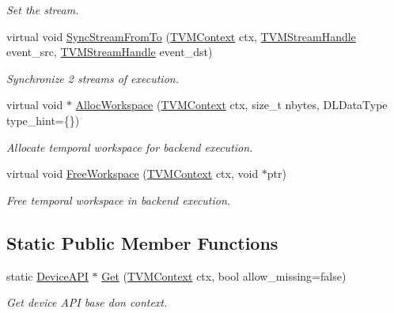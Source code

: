 \begin{DoxyCompactItemize}
\begin{DoxyCompactList}\small\item\em Set the stream. \end{DoxyCompactList}\item 
virtual void \hyperlink{classtvm_1_1runtime_1_1DeviceAPI_ac913e53e874729157e560efc7bc32420}{Sync\+Stream\+From\+To} (\hyperlink{c__runtime__api_8h_a9363bb701f16ce5bbb381f2a013d25b4}{T\+V\+M\+Context} ctx, \hyperlink{c__runtime__api_8h_ab1d5f6b7945e1410602a8a057fda5757}{T\+V\+M\+Stream\+Handle} event\+\_\+src, \hyperlink{c__runtime__api_8h_ab1d5f6b7945e1410602a8a057fda5757}{T\+V\+M\+Stream\+Handle} event\+\_\+dst)
\begin{DoxyCompactList}\small\item\em Synchronize 2 streams of execution. \end{DoxyCompactList}\item 
virtual void $\ast$ \hyperlink{classtvm_1_1runtime_1_1DeviceAPI_a1294018fb28de0f67754d8df98c1e0bd}{Alloc\+Workspace} (\hyperlink{c__runtime__api_8h_a9363bb701f16ce5bbb381f2a013d25b4}{T\+V\+M\+Context} ctx, size\+\_\+t nbytes, D\+L\+Data\+Type type\+\_\+hint=\{\})
\begin{DoxyCompactList}\small\item\em Allocate temporal workspace for backend execution. \end{DoxyCompactList}\item 
virtual void \hyperlink{classtvm_1_1runtime_1_1DeviceAPI_af096fadcf68d2fad804fc8a00a4f4311}{Free\+Workspace} (\hyperlink{c__runtime__api_8h_a9363bb701f16ce5bbb381f2a013d25b4}{T\+V\+M\+Context} ctx, void $\ast$ptr)
\begin{DoxyCompactList}\small\item\em Free temporal workspace in backend execution. \end{DoxyCompactList}\end{DoxyCompactItemize}
\subsection*{Static Public Member Functions}
\begin{DoxyCompactItemize}
\item 
static \hyperlink{classtvm_1_1runtime_1_1DeviceAPI}{Device\+A\+PI} $\ast$ \hyperlink{classtvm_1_1runtime_1_1DeviceAPI_a50365326f6a7cd2f975f72d6503933d8}{Get} (\hyperlink{c__runtime__api_8h_a9363bb701f16ce5bbb381f2a013d25b4}{T\+V\+M\+Context} ctx, bool allow\+\_\+missing=false)
\begin{DoxyCompactList}\small\item\em Get device A\+PI base don context. \end{DoxyCompactList}\end{DoxyCompactItemize}



